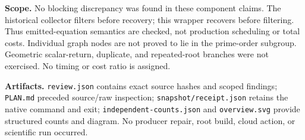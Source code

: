 \documentclass[11pt]{article}
\begin{document}
\textbf{Scope.} No blocking discrepancy was found in these component claims. The historical collector filters before recovery; this wrapper recovers before filtering. Thus emitted-equation semantics are checked, not production scheduling or total costs. Individual graph nodes are not proved to lie in the prime-order subgroup. Geometric scalar-return, duplicate, and repeated-root branches were not exercised. No timing or cost ratio is assigned.

\textbf{Artifacts.} \texttt{review.json} contains exact source hashes and scoped findings; \texttt{PLAN.md} preceded source/raw inspection; \texttt{snapshot/receipt.json} retains the native command and exit; \texttt{independent-counts.json} and \texttt{overview.svg} provide structured counts and diagram. No producer repair, root build, cloud action, or scientific run occurred.
\end{document}
